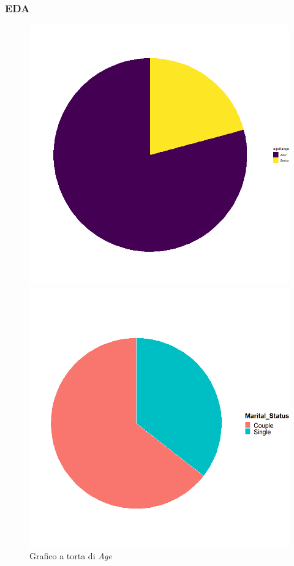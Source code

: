 \begin{frame}[fragile]
\frametitle{EDA}
\begin{figure}[!htb]
  \includegraphics[width=\linewidth]{Img/eda/EDA001.png}
  \caption{Grafico a torta di \textit{Age}}\label{fig:PiePlotAge}
\endminipage\hfill
{}
  \includegraphics[width=\linewidth]{Img/eda/EDA002.png}

\end{figure}
\end{frame}
